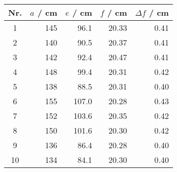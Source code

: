 \begin{tabular}{c|rrrr}
Nr. & $a$ / cm & $e$ / cm & $f$ / cm & $\Delta f$ / cm \\
\hline
1 & 145 & 96.1 & 20.33 & 0.41\\
2 & 140 & 90.5 & 20.37 & 0.41\\
3 & 142 & 92.4 & 20.47 & 0.41\\
4 & 148 & 99.4 & 20.31 & 0.42\\
5 & 138 & 88.5 & 20.31 & 0.40\\
6 & 155 & 107.0 & 20.28 & 0.43\\
7 & 152 & 103.6 & 20.35 & 0.42\\
8 & 150 & 101.6 & 20.30 & 0.42\\
9 & 136 & 86.4 & 20.28 & 0.40\\
10 & 134 & 84.1 & 20.30 & 0.40
\end{tabular}
